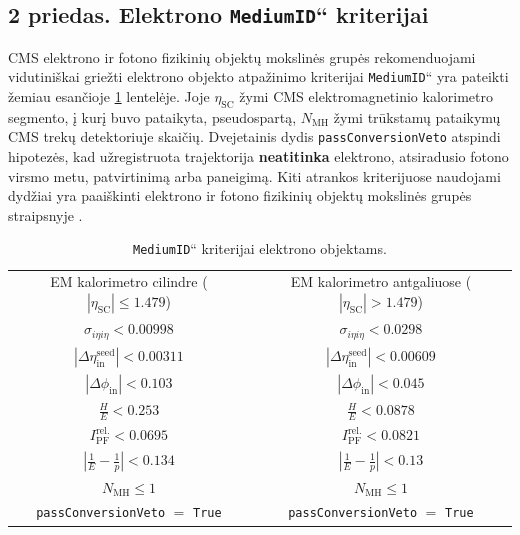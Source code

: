\documentclass[a4paper, 12pt, oneside]{article}
\newcommand{\ttt}[1]{\texttt{#1}}
\newcommand{\ltq}[1]{{\quotedblbase{}#1\textquotedblleft{}}}
\newlength\q
\begin{document}
\subsection*{2 priedas. Elektrono \ltq{\ttt{MediumID}} kriterijai}
CMS elektrono ir fotono fizikinių objektų mokslinės grupės rekomenduojami vidutiniškai griežti elektrono objekto atpažinimo
kriterijai \ltq{\ttt{MediumID}} yra pateikti žemiau esančioje \ref{table:MediumID} lentelėje.
Joje $\eta_{\mathrm{SC}}$ žymi CMS elektromagnetinio kalorimetro segmento, į kurį buvo pataikyta, pseudospartą,
$N_{\mathrm{MH}}$ žymi trūkstamų pataikymų CMS trekų detektoriuje skaičių.
Dvejetainis dydis \ttt{passConversionVeto} atspindi hipotezės, kad užregistruota trajektorija \textbf{neatitinka} elektrono,
atsiradusio fotono virsmo metu, patvirtinimą arba paneigimą.
Kiti atrankos kriterijuose naudojami dydžiai yra paaiškinti elektrono ir fotono fizikinių objektų mokslinės grupės
straipsnyje \cite{EleID}.
\begin{table}[H]
	\begin{tabular}{|c|c|}
		\hline
		\multirow{2}{15em}{\centering EM kalorimetro cilindre ($|\eta_{\mathrm{SC}}| \leqslant 1.479$)} &
			\multirow{2}{15em}{\centering EM kalorimetro antgaliuose ($|\eta_{\mathrm{SC}}| > 1.479$)} \\
		 & \\
		\hline
		$\sigma_{i\eta i\eta}<0.00998$ & $\sigma_{i\eta i\eta}<0.0298$ \\
		$|\Delta\eta_{\mathrm{in}}^{\mathrm{seed}}|<0.00311$ & $|\Delta\eta_{\mathrm{in}}^{\mathrm{seed}}|<0.00609$ \\
		$|\Delta\phi_{\mathrm{in}}|<0.103$ & $|\Delta\phi_{\mathrm{in}}|<0.045$ \\
		\multirow{2}{15em}{\centering$\displaystyle\frac{H}{E}<0.253$} &
			\multirow{2}{15em}{\centering$\displaystyle\frac{H}{E}<0.0878$} \\
		 & \\
		$I_{\mathrm{PF}}^{\mathrm{rel.}}<0.0695$ & $I_{\mathrm{PF}}^{\mathrm{rel.}}<0.0821$ \\
		\multirow{2}{15em}{\centering$\displaystyle \left| \frac{1}{E} - \frac{1}{p} \right|<0.134$} &
			\multirow{2}{15em}{\centering$\displaystyle \left| \frac{1}{E} - \frac{1}{p} \right|<0.13$} \\
		 & \\
		$N_{\mathrm{MH}}\leqslant1$ & $N_{\mathrm{MH}}\leqslant1$ \\
		\ttt{passConversionVeto} $=$ \ttt{True} & \ttt{passConversionVeto} $=$ \ttt{True} \\
		\hline
	\end{tabular}
	\caption{\label{table:MediumID} \ltq{\ttt{MediumID}} kriterijai elektrono objektams.}
\end{table}
\end{document}
